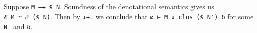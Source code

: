 \begin{fence}
\begin{code}%
\>[0]%
\>[2036I]\AgdaSymbol{:}\AgdaSpace{}%
\AgdaSpace{}%
\AgdaSymbol{\{}\AgdaSpace{}%
\AgdaSymbol{:}\AgdaSpace{}%
\AgdaSpace{}%
\AgdaSpace{}%
\AgdaSymbol{\}}\AgdaSpace{}%
\AgdaSymbol{\{}\AgdaSpace{}%
\AgdaSymbol{:}\AgdaSpace{}%
\AgdaSpace{}%
\AgdaOperator{\AgdaInductiveConstructor{,}}\AgdaSpace{}%
\AgdaSpace{}%
\AgdaSpace{}%
\AgdaSymbol{\}}\<%
\\
\>[.][@{}l@{}]\<[2036I]%
\>[11]\AgdaSpace{}%
\AgdaSpace{}%
\AgdaSpace{}%
\AgdaSpace{}%
\<%
\\
%
\>[11]%
\>[2054I]\AgdaFunction{Σ[}\AgdaSpace{}%
\AgdaSpace{}%
\AgdaSpace{}%
\AgdaSpace{}%
\AgdaFunction{]}\AgdaSpace{}%
\AgdaFunction{Σ[}\AgdaSpace{}%
\AgdaSpace{}%
\AgdaSpace{}%
\AgdaSpace{}%
\AgdaOperator{\AgdaInductiveConstructor{,}}\AgdaSpace{}%
\AgdaSpace{}%
\AgdaSpace{}%
\AgdaSpace{}%
\AgdaFunction{]}\AgdaSpace{}%
\AgdaFunction{Σ[}\AgdaSpace{}%
\AgdaSpace{}%
\AgdaSpace{}%
\AgdaSpace{}%
\AgdaSpace{}%
\AgdaFunction{]}\<%
\\
\>[.][@{}l@{}]\<[2054I]%
\>[13]\AgdaSpace{}%
\AgdaSpace{}%
\AgdaSpace{}%
\AgdaSpace{}%
\AgdaSpace{}%
\AgdaSymbol{(}\AgdaSpace{}%
\AgdaSymbol{)}\AgdaSpace{}%
\<%
\\
\>[0]\AgdaSpace{}%
\AgdaSpace{}%
\AgdaSymbol{=}\AgdaSpace{}%
\AgdaSpace{}%
\AgdaSymbol{(}\AgdaSpace{}%
\AgdaSymbol{)}\<%
\end{code}
\end{fence}

Suppose \texttt{M\ —↠\ ƛ\ N}. Soundness of the denotational semantics
gives us \texttt{ℰ\ M\ ≃\ ℰ\ (ƛ\ N)}. Then by \texttt{↓→⇓} we conclude
that \texttt{∅\textquotesingle{}\ ⊢\ M\ ⇓\ clos\ (ƛ\ N′)\ δ} for some
\texttt{N′} and \texttt{δ}.

